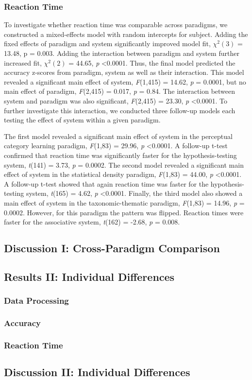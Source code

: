 \documentclass[../dissertation.tex]{subfiles}
\begin{document}
\subsubsection{Reaction Time}
To investigate whether reaction time was comparable across paradigms, we constructed a mixed-effects model with random intercepts for subject. Adding the fixed effects of paradigm and system significantly improved model fit,  $\chi^{2}(3)$ = 13.48, p = 0.003. Adding the interaction between paradigm and system further increased fit,  $\chi^{2}(2)$  = 44.65, \textit{p} \textless 0.0001. Thus, the final model predicted the accuracy z-scores from paradigm, system as well as their interaction. This model revealed a significant main effect of system, \textit{F}(1,415) = 14.62, \textit{p} = 0.0001, but no main effect of paradigm, \textit{F}(2,415) = 0.017, \textit{p} = 0.84. The interaction between system and paradigm was also significant, \textit{F}(2,415) = 23.30, \textit{p} \textless 0.0001. To further investigate this interaction, we conducted three follow-up models each testing the effect of system within a given paradigm. \par
	The first model revealed a significant main effect of system in the perceptual category learning paradigm, \textit{F}(1,83) = 29.96, \textit{p} \textless 0.0001. A follow-up t-test confirmed that reaction time was significantly faster for the hypothesis-testing system, \textit{t}(141) = 3.73, \textit{p} = 0.0002. The second model revealed a significant main effect of system in the statistical density paradigm, \textit{F}(1,83) = 44.00, \textit{p} \textless 0.0001. A follow-up t-test showed that again reaction time was faster for the hypothesis-testing system, \textit{t}(165) = 4.62, \textit{p} \textless 0.0001.  Finally, the third model also showed a main effect of system in the taxonomic-thematic paradigm, \textit{F}(1,83) = 14.96, \textit{p} = 0.0002. However, for this paradigm the pattern was flipped. Reaction times were faster for the associative system, \textit{t}(162) = -2.68, \textit{p} = 0.008.
	
\subsection{Discussion I: Cross-Paradigm Comparison}


\subsection{Results II: Individual Differences}
\subsubsection{Data Processing}
\subsubsection{Accuracy}
\subsubsection{Reaction Time}

\subsection{Discussion II: Individual Differences}
\end{document}
